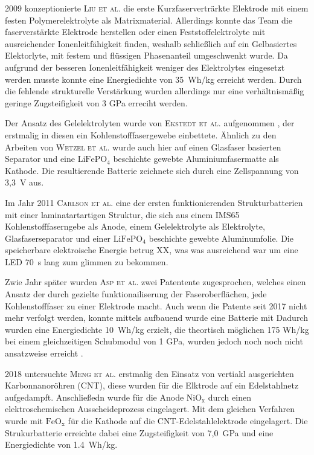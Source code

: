 2009 konzeptionierte \textsc{Liu et al.} \cite{Liu2009} die erste Kurzfaserverträrkte Elektrode mit einem festen Polymerelektrolyte als Matrixmaterial. Allerdings konnte das Team die faserverstärkte Elektrode herstellen oder einen Feststoffelektrolyte mit ausreichender Ionenleitfähigkeit finden, weshalb schließlich auf ein Gelbasiertes Elektorlyte, mit festem und flüssigen Phasenanteil umgeschwenkt wurde. Da aufgrund der besseren Ionenleitfähigkeit weniger des Elektrolytes eingesetzt werden musste konnte eine Energiedichte von 35~Wh/kg erreicht werden.  Durch die fehlende strukturelle Verstärkung wurden allerdings nur eine verhältnismäßig geringe Zugsteifigkeit von 3 GPa erreciht werden.

Der Ansatz des Gelelektrolyten wurde von \textsc{Ekstedt et al.} aufgenommen \cite{Ekstedt2010}, der erstmalig in diesen ein Kohlenstofffasergewebe einbettete. Ähnlich zu den Arbeiten von \textsc{Wetzel et al.} wurde auch hier auf einen Glasfaser basierten Separator und eine $\text{LiFePO}_\text{4}$ beschichte gewebte Aluminiumfasermatte als Kathode. Die resultierende Batterie zeichnete sich durch eine Zellspannung von 3,3~V aus.

Im Jahr 2011 \textsc{Carlson et al.} \cite{Carlson2011} eine der ersten funktionierenden Strukturbatterien mit einer laminatartartigen Struktur, die sich aus einem IMS65 Kohlenstofffaserngebe als Anode, einem Gelelektrolyte als Elektrolyte, Glasfaserseparator und einer  $\text{LiFePO}_\text{4}$ beschichte gewebte Aluminumfolie. Die speicherbare elektroische Energie betrug XX, was  was ausreichend war um eine LED 70~s lang zum glimmen zu bekommen.

Zwie Jahr später wurden \textsc{Asp et al.} \cite{Asp2013US,Asp2013CN} zwei Patentente zugesprochen, welches einen Ansatz der durch gezielte funktionailiserung der Faseroberflächen, jede Kohlenstofffaser zu einer Elektrode macht. Auch wenn die Patente seit 2017 nicht mehr verfolgt werden, konnte mittels aufbauend wurde eine Batterie mit 
Dadurch wurden eine Energiedichte 10~Wh/kg erzielt, die theortisch möglichen 175 Wh/kg bei einem gleichzeitigen Schubmodul von 1 GPa, wurden jedoch noch noch nicht ansatzweise erreicht \cite{Leijonmarck2013, Carlson2013}.

2018 untersuchte \textsc{Meng et al.} \cite{Meng2018} erstmalig den Einsatz von vertiakl ausgerichten Karbonnanoröhren (CNT), diese wurden für die Elktrode auf ein Edelstahlnetz aufgedampft. Anschließedn wurde für die Anode $\text{NiO}_\text{x}$ durch einen elektroschemischen Ausscheideprozess eingelagert. Mit dem gleichen Verfahren wurde mit $\text{FeO}_\text{x}$ für die Kathode auf die CNT-Edelstahlelektrode eingelagert. Die Strukurbatterie erreichte dabei eine Zugsteifigkeit von 7,0~GPa und eine Energiedichte von 1.4~Wh/kg.

